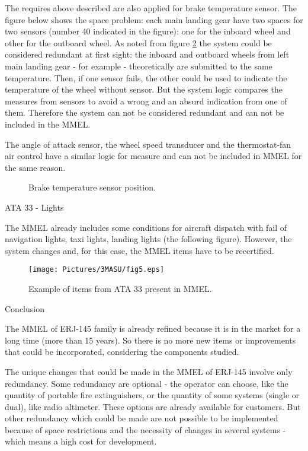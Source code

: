 The requires above described are also applied for brake temperature sensor. The figure below shows the space problem: each main landing gear have two spaces for two sensors (number 40 indicated in the figure): one for the inboard wheel and other for the outboard wheel. As noted from figure \ref{fig:breakEx3} the system could be considered redundant at first sight: the inboard and outboard wheels from left main landing gear - for example - theoretically are submitted to the same temperature. Then, if one sensor fails, the other could be used to indicate the temperature of the wheel without sensor. But the system logic compares the measures from sensors to avoid a wrong and an absurd indication from one of them. Therefore the system can not be considered redundant and can not be included in the MMEL.

The angle of attack sensor, the wheel speed transducer and the thermostat-fan air control have a similar logic for measure and can not be included in MMEL for the same reason.

\begin{figure}[H] %
\label{fig:breakEx1}
\end{figure}

\begin{figure}[H] %
    \caption{Brake temperature sensor position.}
\label{fig:breakEx3}
\end{figure}





ATA 33 - Lights

The MMEL already includes some conditions for aircraft dispatch with fail of navigation lights, taxi lights, landing lights (the following figure). However, the system changes and, for this case, the MMEL items have to be recertified.

\begin{figure}[H]
	\centering
	\texttt{[image: Pictures/3MASU/fig5.eps]}
	\caption{Example of items from ATA 33 present in MMEL.}
	\label{fig:MMELExample3}
\end{figure}

Conclusion

The MMEL of ERJ-145 family is already refined because it is in the market for a long time (more than 15 years). So there is no more new items or improvements that could be incorporated, considering the components studied.

The unique changes that could be made in the MMEL of ERJ-145 involve only redundancy. Some redundancy are optional - the operator can choose, like the quantity of portable fire extinguishers, or the quantity of some systems (single or dual), like radio altimeter. These options are already available for customers. But other redundancy which could be made are not possible to be implemented because of space restrictions and the necessity of changes in several systems - which means a high cost for development.
